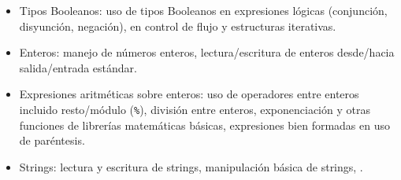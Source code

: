 \begin{itemize}
\item[\basic] Tipos Booleanos: uso de tipos Booleanos en expresiones lógicas (conjunción, disyunción, negación), en control de flujo y estructuras iterativas.

\item[\basic] Enteros: manejo de números enteros, lectura/escritura de enteros desde/hacia salida/entrada estándar.

\item[\basic] Expresiones aritméticas sobre enteros: uso de operadores entre enteros incluido resto/módulo (\texttt{\%}),
división entre enteros, exponenciación y otras funciones de librerías matemáticas básicas, 
expresiones bien formadas en uso de paréntesis.

\item[\basic] Strings: lectura y escritura de strings, manipulación básica de strings, . 

\end{itemize}


